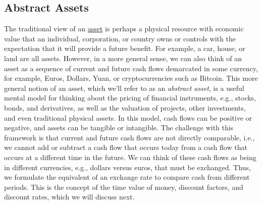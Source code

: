 \documentclass[11pt]{article}
\theoremstyle{definition}
\newcommand{\newterm}[1]{{\it #1}}
\begin{document}
\subsection{Abstract Assets}
The traditional view of an \href{https://en.wikipedia.org/wiki/Asset}{asset} is perhaps a physical resource with economic value that an individual, corporation, or country owns or controls with the expectation that it will provide a future benefit.
For example, a car, house, or land are all assets.
However, in a more general sense, we can also think of an asset as a sequence of current and future cash flows demarcated in some currency, for example, Euros, Dollars, Yuan, or cryptocurrencies such as Bitcoin.
This more general notion of an asset, which we'll refer to as an \newterm{abstract asset}, is a useful mental model for thinking about the pricing of financial instruments, e.g., stocks, bonds, and derivatives, 
as well as the valuation of projects, other investments, and even traditional physical assets.
In this model, cash flows can be positive or negative, and assets can be tangible or intangible.
The challenge with this framework is that current and future cash flows are not directly comparable,
i.e., we cannot add or subtract a cash flow that occurs today from a cash flow that occurs at a different time in the future.
We can think of these cash flows as being in different currencies, e.g., dollars versus euros, that must be exchanged. 
Thus, we formulate the equivalent of an exchange rate to compare cash from different periods.
This is the concept of the time value of money, discount factors, and discount rates, which we will discuss next.
\end{document}
